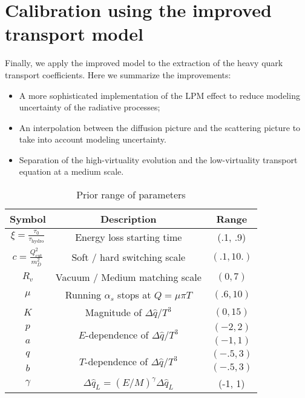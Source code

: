 \section{Calibration using the improved transport model}
Finally, we apply the improved model to the extraction of the heavy quark transport coefficients.
Here we summarize the improvements:
\begin{itemize}
\item A more sophisticated implementation of the LPM effect to reduce modeling uncertainty of the radiative processes;
\item An interpolation between the diffusion picture and the scattering picture to take into account modeling uncertainty.
\item Separation of the high-virtuality evolution and the low-virtuality transport equation at a medium scale.
\end{itemize}

\begin{table}
\centering
\caption{Prior range of parameters}\label{table:new:prior}
\begin{tabular}{ccc}
\hline
Symbol & Description & Range \\
\hline
$\xi = \frac{\tau_0}{\tau_{\textrm{hydro}}}$ & Energy loss starting time & (.1, .9) \\
$c = \frac{Q_{\textrm{cut}}^2}{m_D^2}$ & Soft / hard switching scale & $(.1, 10.)$ \\
$R_v$ & Vacuum / Medium matching scale & $(0,7)$\\
$\mu$ & Running $\alpha_s$ stops at $Q = \mu\pi T$ & $(.6, 10)$ \\
$K$ & Magnitude of $\Delta \hat{q}/T^3$ & $(0, 15)$\\ 
$p$ & \multirow{2}{*}{$E$-dependence of $\Delta \hat{q}/T^3$} & $(-2, 2)$\\ 
$a$ &  & $(-1, 1)$\\ 
$q$ & \multirow{2}{*}{$T$-dependence of $\Delta \hat{q}/T^3$}  & $(-.5, 3)$\\ 
$b$ &   & $(-.5, 3)$\\ 
$\gamma$ & $\Delta \hat{q}_L = (E/M)^\gamma\Delta \hat{q}_L$  & (-1, 1)\\ 
\hline
\end{tabular}
\end{table}

